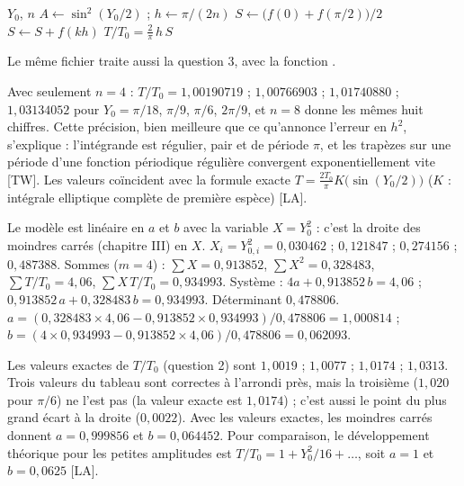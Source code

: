 \begin{algo}
  \Require $Y_0$, $n$
  \State $A \leftarrow \sin^2(Y_0/2)$ ; $h \leftarrow \pi/(2n)$
  \State $S \leftarrow \bigl(f(0) + f(\pi/2)\bigr)/2$
   \State $S \leftarrow S + f(kh)$ \EndFor
  \Print $T/T_0 = \frac2\pi\,h\,S$
\end{algo}

Le même fichier traite aussi la question 3, avec la fonction
.

\Verif Avec seulement $n = 4$ :
$T/T_0 = 1{,}00190719$ ; $1{,}00766903$ ; $1{,}01740880$ ; $1{,}03134052$ pour
$Y_0 = \pi/18$, $\pi/9$, $\pi/6$, $2\pi/9$, et $n = 8$ donne les mêmes huit
chiffres. Cette précision, bien meilleure que ce qu'annonce l'erreur en $h^2$,
s'explique : l'intégrande est régulier, pair et de période $\pi$, et les
trapèzes sur une période d'une fonction périodique régulière convergent
exponentiellement vite [TW]. Les valeurs coïncident avec la formule exacte
$T = \frac{2T_0}\pi K\bigl(\sin(Y_0/2)\bigr)$ ($K$ : intégrale elliptique
complète de première espèce) [LA].

\Pourquoi Le modèle est linéaire en $a$ et $b$ avec la variable $X = Y_0^2$ :
c'est la droite des moindres carrés (chapitre III) en $X$.
\Etapes
{} $X_i = Y_{0,i}^2 = 0{,}030462$ ; $0{,}121847$ ; $0{,}274156$ ;
$0{,}487388$. Sommes ($m = 4$) : $\sum X = 0{,}913852$,
$\sum X^2 = 0{,}328483$, $\sum T/T_0 = 4{,}06$,
$\sum X\,T/T_0 = 0{,}934993$.
 Système :
$4a + 0{,}913852\,b = 4{,}06$ ; $0{,}913852\,a + 0{,}328483\,b = 0{,}934993$.
Déterminant $0{,}478806$.
 $a = (0{,}328483 \times 4{,}06 - 0{,}913852 \times 0{,}934993)/0{,}478806
      = 1{,}000814$ ; $b = (4 \times 0{,}934993 - 0{,}913852 \times 4{,}06)/0{,}478806
      = 0{,}062093$.

\Attention Les valeurs exactes de $T/T_0$ (question 2) sont $1{,}0019$ ;
$1{,}0077$ ; $1{,}0174$ ; $1{,}0313$. Trois valeurs du tableau sont correctes à
l'arrondi près, mais la troisième ($1{,}020$ pour $\pi/6$) ne l'est pas (la
valeur exacte est $1{,}0174$) ; c'est aussi le point du plus grand écart à la
droite ($0{,}0022$). Avec les valeurs exactes, les moindres carrés donnent
$a = 0{,}999856$ et $b = 0{,}064452$. Pour comparaison, le développement
théorique pour les petites amplitudes est $T/T_0 = 1 + Y_0^2/16 + \dots$, soit
$a = 1$ et $b = 0{,}0625$ [LA].

